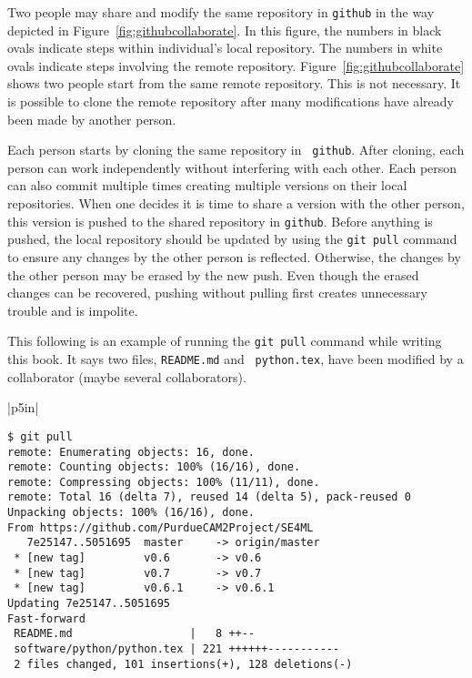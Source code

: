 Two people may share and modify the same repository in {\tt github} in
the way depicted in Figure~\ref{fig:githubcollaborate}.  In this
figure, the numbers in black ovals indicate steps within individual's
local repository.  The numbers in white ovals indicate steps involving
the remote repository.
Figure~\ref{fig:githubcollaborate} shows two people start from the
same remote repository. This is not necessary.  It is possible
to clone the remote repository after many modifications have already
been made by another person.

Each person starts by cloning the same repository in {\tt
  github}. After cloning, each person can work independently without
interfering with each other. Each person can also commit multiple
times creating multiple versions on their local repositories.  When
one decides it is time to share a version with the other person, this
version is pushed to the shared repository in {\tt github}.  Before
anything is pushed, the local repository should be updated by using
the {\tt git pull} command to ensure any changes by the other person
is reflected. Otherwise, the changes by the other person may be erased
by the new push.  Even though the erased changes can be recovered,
pushing without pulling first creates unnecessary trouble and is
impolite.



This following is an example of running the {\tt git pull} command
while writing this book. It says two files, {\tt README.md} and {\tt
  python.tex}, have been modified by a collaborator (maybe several
collaborators).

\vspace{0.2in}
\noindent
\begin{tabular}{|p{5in}|}\hline
\begin{verbatim}
$ git pull
remote: Enumerating objects: 16, done.
remote: Counting objects: 100% (16/16), done.
remote: Compressing objects: 100% (11/11), done.
remote: Total 16 (delta 7), reused 14 (delta 5), pack-reused 0
Unpacking objects: 100% (16/16), done.
From https://github.com/PurdueCAM2Project/SE4ML
   7e25147..5051695  master     -> origin/master
 * [new tag]         v0.6       -> v0.6
 * [new tag]         v0.7       -> v0.7
 * [new tag]         v0.6.1     -> v0.6.1
Updating 7e25147..5051695
Fast-forward
 README.md                  |   8 ++--
 software/python/python.tex | 221 ++++++-----------
 2 files changed, 101 insertions(+), 128 deletions(-)
\end{verbatim}
\\ \hline
\end{tabular}
\vspace{0.2in}



